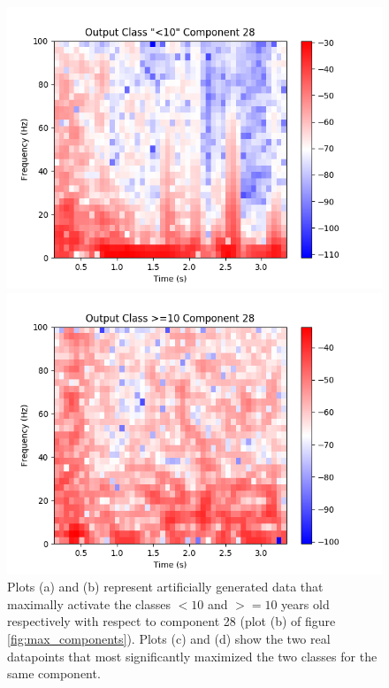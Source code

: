 \documentclass[fleqn,10pt]{wlscirep}
\begin{document}
\begin{figure}
\begin{minipage}{0.47\textwidth}
    \includegraphics[width=\linewidth]{max_act/real_0_28.png}
  \end{minipage}
  \hspace*{\fill} 
  \begin{minipage}{0.47\textwidth}
    \includegraphics[width=\linewidth]{max_act/real_1_28.png}
  \end{minipage}
  \caption{Plots (a) and (b) represent artificially generated data that maximally activate the classes $<10$ and $>=10$ years old respectively with respect to component 28 (plot (b) of figure \ref{fig:max_components}). Plots (c) and (d) show the two real datapoints that most significantly maximized the two classes for the same component.}
  \label{fig:component_28}
\end{figure}
\end{document}
